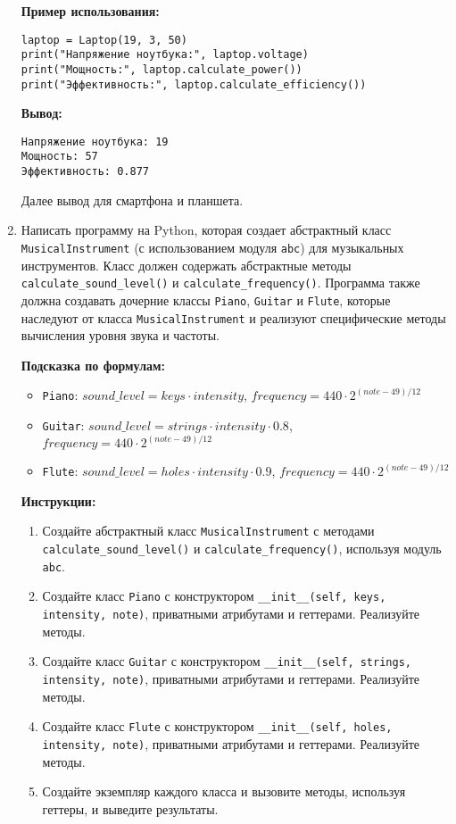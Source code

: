 \begin{enumerate}
\textbf{Пример использования:}
\begin{verbatim}
laptop = Laptop(19, 3, 50)
print("Напряжение ноутбука:", laptop.voltage)
print("Мощность:", laptop.calculate_power())
print("Эффективность:", laptop.calculate_efficiency())
\end{verbatim}

\textbf{Вывод:}
\begin{verbatim}
Напряжение ноутбука: 19
Мощность: 57
Эффективность: 0.877
\end{verbatim}

Далее вывод для смартфона и планшета.

\item
Написать программу на Python, которая создает абстрактный класс \texttt{MusicalInstrument} (с использованием модуля \texttt{abc}) для музыкальных инструментов. 
Класс должен содержать абстрактные методы \texttt{calculate\_sound\_level()} и \texttt{calculate\_frequency()}. 
Программа также должна создавать дочерние классы \texttt{Piano}, \texttt{Guitar} и \texttt{Flute}, 
которые наследуют от класса \texttt{MusicalInstrument} и реализуют специфические методы вычисления уровня звука и частоты.

\textbf{Подсказка по формулам:}
\begin{itemize}
    \item \texttt{Piano}: $sound\_level = keys \cdot intensity$, $frequency = 440 \cdot 2^{(note-49)/12}$
    \item \texttt{Guitar}: $sound\_level = strings \cdot intensity \cdot 0.8$, $frequency = 440 \cdot 2^{(note-49)/12}$
    \item \texttt{Flute}: $sound\_level = holes \cdot intensity \cdot 0.9$, $frequency = 440 \cdot 2^{(note-49)/12}$
\end{itemize}

\textbf{Инструкции:}
\begin{enumerate}
    \item Создайте абстрактный класс \texttt{MusicalInstrument} с методами \texttt{calculate\_sound\_level()} и \texttt{calculate\_frequency()}, используя модуль \texttt{abc}.
    \item Создайте класс \texttt{Piano} с конструктором \texttt{\_\_init\_\_(self, keys, intensity, note)}, приватными атрибутами и геттерами. Реализуйте методы.
    \item Создайте класс \texttt{Guitar} с конструктором \texttt{\_\_init\_\_(self, strings, intensity, note)}, приватными атрибутами и геттерами. Реализуйте методы.
    \item Создайте класс \texttt{Flute} с конструктором \texttt{\_\_init\_\_(self, holes, intensity, note)}, приватными атрибутами и геттерами. Реализуйте методы.
    \item Создайте экземпляр каждого класса и вызовите методы, используя геттеры, и выведите результаты.
\end{enumerate}


\end{enumerate}

